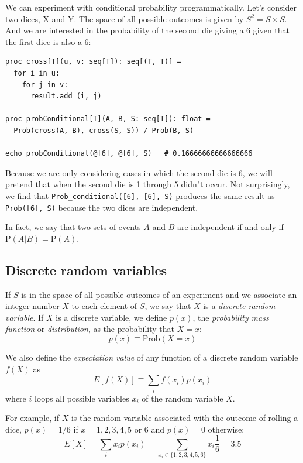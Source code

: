 \documentclass[justified, sixbynine]{tufte-book}
\def\ft{\small\tt}
\theoremstyle{plain}%
\newtheorem * {corollary}{Corollary}
\theoremstyle{definition}
\theoremstyle{remark}
\newtheorem * {remark}{Remark}
\newtheorem * {note}{Note}
\begin{document}
\begin{fullwidth}
We can experiment with conditional probability programmatically. Let's consider two dices, X and Y.
The space of all possible outcomes is given by $S^2 = S \times S$.
And we are interested in the probability of the second die giving a $6$ given that the first dice is also a $6$:

\begin{lstlisting}
proc cross[T](u, v: seq[T]): seq[(T, T)] =
  for i in u:
    for j in v:
      result.add (i, j)

proc probConditional[T](A, B, S: seq[T]): float =
  Prob(cross(A, B), cross(S, S)) / Prob(B, S)

echo probConditional(@[6], @[6], S)   # 0.16666666666666666
\end{lstlisting}

Because we are only considering cases in which the second die is 6, we will pretend that when the second die is 1 through 5 didn"t occur.
Not surprisingly, we find that {\ft Prob\_conditional([6], [6], S)} produces the same result as
{\ft Prob([6], S)} because the two dices are independent.

In fact, we say that two sets of events $A$ and $B$ are independent if and only if $\textrm{P}(A|B) = \textrm{P}(A)$.


\goodbreak\subsection{Discrete random variables}

If $S$ is in the space of all possible outcomes of an experiment and we
associate an integer number $X$ to each element of $S$, we say that $X$ is a
{\it discrete random variable}. If $X$ is a discrete variable, we define $%
p(x)$, the {\it probability mass function} or {\it distribution}, as the
probability that $X=x$:
\begin{equation}
p(x) \equiv \textrm{Prob}(X=x)
\end{equation}

We also define the {\it expectation value} of any function of a discrete
random variable $f(X)$ as
\begin{equation}
E[f(X)] \equiv  \sum_i f(x_i)p(x_i)
\end{equation}
where $i$ loops all possible variables $x_i$ of the random variable $X$.

For example, if $X$ is the random variable associated with the outcome of rolling a dice, $p(x)=1/6$ if $x=1, 2, 3, 4, 5$ or $6$ and $p(x)=0$ otherwise:
\begin{equation}
E[X]=\sum_ix_ip(x_i)=\sum_{x_i\in \{1, 2, 3, 4, 5, 6\}}x_i\frac 16=3.5
\end{equation}


\end{fullwidth}
\end{document}
